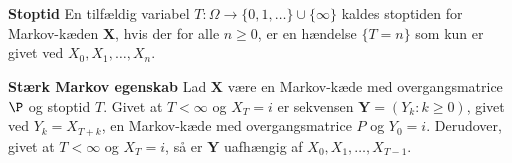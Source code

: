 \section{}
\begin{minipage}\textwidth
\begin{defn}\label{stoptid}\textbf{Stoptid} %
\newline
En tilfældig variabel $T: \Omega \to \{0,1,\ldots\}\cup \{\infty\}$ kaldes stoptiden for Markov-kæden $\bm X$, hvis der for alle $n\geq 0$, er en hændelse $\{T = n\}$ som kun er givet ved $X_0,X_1, \ldots, X_n$.
\end{defn}
\end{minipage}

\begin{minipage}\textwidth
\begin{thmx} \label{stærk_markov}\textbf{Stærk Markov egenskab} %
\newline
Lad $\bm X$ være en Markov-kæde med overgangsmatrice $\P$ og stoptid $T$. Givet at $T < \infty$ og $X_T = i$ er sekvensen $\bm Y = (Y_k: k \geq 0)$, givet ved $Y_k = X_{T+k}$, en Markov-kæde med overgangsmatrice $P$ og $Y_0=i$. Derudover, givet at $T < \infty$ og $X_T = i$, så er $\bm Y$ uafhængig af $X_0, X_1, \ldots, X_{T-1}$.
\end{thmx}
\end{minipage}